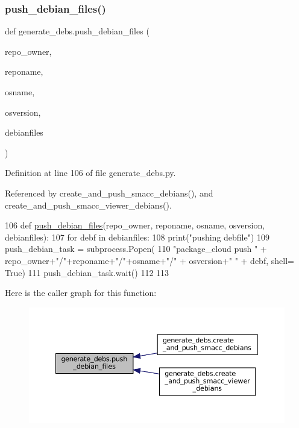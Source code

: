 \subsubsection{\texorpdfstring{push\+\_\+debian\+\_\+files()}{push\_debian\_files()}}
{\footnotesize\ttfamily def generate\+\_\+debs.\+push\+\_\+debian\+\_\+files (\begin{DoxyParamCaption}\item[{}]{repo\+\_\+owner,  }\item[{}]{reponame,  }\item[{}]{osname,  }\item[{}]{osversion,  }\item[{}]{debianfiles }\end{DoxyParamCaption})}



Definition at line 106 of file generate\+\_\+debs.\+py.



Referenced by create\+\_\+and\+\_\+push\+\_\+smacc\+\_\+debians(), and create\+\_\+and\+\_\+push\+\_\+smacc\+\_\+viewer\+\_\+debians().


\begin{DoxyCode}
106 \textcolor{keyword}{def }\hyperlink{namespacegenerate__debs_a9b22f5ad65b40b7903c467eda308e575}{push\_debian\_files}(repo\_owner, reponame,  osname, osversion, debianfiles):
107     \textcolor{keywordflow}{for} debf \textcolor{keywordflow}{in} debianfiles:
108         print(\textcolor{stringliteral}{"pushing debfile"})
109         push\_debian\_task = subprocess.Popen(
110             \textcolor{stringliteral}{"package\_cloud push "} + repo\_owner+\textcolor{stringliteral}{"/"}+reponame+\textcolor{stringliteral}{"/"}+osname+\textcolor{stringliteral}{"/"} + osversion+\textcolor{stringliteral}{" "} + debf, shell=\textcolor{keyword}{
      True})
111         push\_debian\_task.wait()
112 
113 
\end{DoxyCode}
Here is the caller graph for this function\+:
\nopagebreak
\begin{figure}[H]
\begin{center}
\leavevmode
\includegraphics[width=350pt]{namespacegenerate__debs_a9b22f5ad65b40b7903c467eda308e575_icgraph}
\end{center}
\end{figure}
\mbox{\label{namespacegenerate__debs_a08095040d038b3613ad0e77fd4e7f60e}} 
